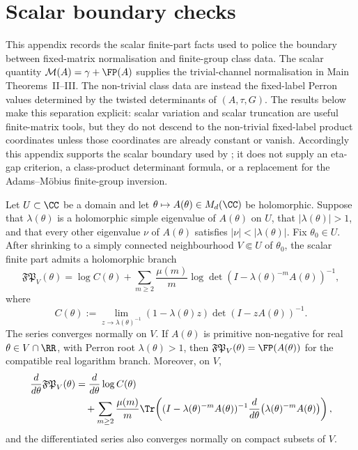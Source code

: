 ﻿\section{Scalar boundary checks}
\label{app:scalar-boundaries}

This appendix records the scalar finite-part facts used to police the boundary
between fixed-matrix normalisation and finite-group class data.  The scalar
quantity \(\mathcal M(A)=\gamma+\FP(A)\) supplies the trivial-channel
normalisation in Main Theorems~II--III.  The non-trivial class data are instead
the fixed-label Perron values determined by the twisted determinants of
\((A,\tau,G)\).  The results below make this separation explicit: scalar
variation and scalar truncation are useful finite-matrix tools, but they do not
descend to the non-trivial fixed-label product coordinates unless those
coordinates are already constant or vanish.
Accordingly this appendix supports the scalar boundary used by
; it does not supply an
eta-gap criterion, a class-product determinant formula, or a replacement for
the Adams--M\"obius finite-group inversion.

\begin{theorem}
  \label{thm:finite-part-holomorphic-variation}
  Let \(U\subset\CC\) be a domain and let
  \(\theta\mapsto A(\theta)\in M_d(\CC)\) be holomorphic.  Suppose that
  \(\lambda(\theta)\) is a holomorphic simple eigenvalue of \(A(\theta)\) on
  \(U\), that \(|\lambda(\theta)|>1\), and that every other eigenvalue \(\nu\)
  of \(A(\theta)\) satisfies \(|\nu|<|\lambda(\theta)|\).  Fix
  \(\theta_0\in U\).  After shrinking to a simply connected neighbourhood
  \(V\Subset U\) of \(\theta_0\), the scalar finite part admits a holomorphic
  branch
  \[
    \mathfrak{FP}_{V}(\theta)
    =
    \log C(\theta)
    +\sum_{m\ge2}\frac{\mu(m)}{m}
      \log\det(I-\lambda(\theta)^{-m}A(\theta))^{-1},
  \]
  where
  \[
    C(\theta):=
    \lim_{z\to\lambda(\theta)^{-1}}
      (1-\lambda(\theta)z)\det(I-zA(\theta))^{-1}.
  \]
  The series converges normally on \(V\).  If \(A(\theta)\) is primitive
  non-negative for real \(\theta\in V\cap\RR\), with Perron root
  \(\lambda(\theta)>1\), then
  \(\mathfrak{FP}_{V}(\theta)=\FP(A(\theta))\) for the compatible real
  logarithm branch.  Moreover, on \(V\),
  \[
  \begin{aligned}
    \frac{d}{d\theta}\mathfrak{FP}_{V}(\theta)
    &=
    \frac{d}{d\theta}\log C(\theta)  \\
    &\quad+
    \sum_{m\ge2}\frac{\mu(m)}{m}
      \Tr\!\left(
        (I-\lambda(\theta)^{-m}A(\theta))^{-1}
        \frac{d}{d\theta}
          \bigl(\lambda(\theta)^{-m}A(\theta)\bigr)
      \right),
  \end{aligned}
  \]
  and the differentiated series also converges normally on compact subsets of
  \(V\).
\end{theorem}

